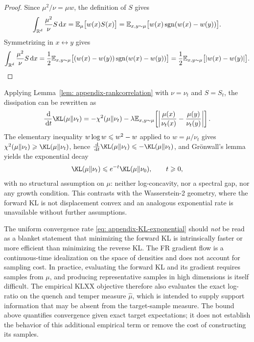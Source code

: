 \documentclass{article}
\begin{document}
\begin{proof}
Since $\mu^2/\nu = \mu w$, the definition of $S$ gives
\begin{equation*}
    \int_{\mathbb R^d}\frac{\mu^2}{\nu}S\,\mathrm d x = \mathbb E_\mu\bigl[w(x)S(x)\bigr] = \mathbb E_{x,y\sim\mu}\bigl[w(x)\operatorname{sgn}(w(x) - w(y))\bigr].
\end{equation*}
Symmetrizing in $x\leftrightarrow y$ gives
\begin{equation*}
    \int_{\mathbb R^d}\frac{\mu^2}{\nu}S\,\mathrm d x = \frac{1}{2} \mathbb E_{x,y\sim\mu}\bigl[(w(x) - w(y))\operatorname{sgn}(w(x) - w(y))\bigr] = \frac{1}{2} \mathbb E_{x,y\sim\mu}\bigl[ |w(x) - w(y)| \bigr].
\end{equation*}
\end{proof}

Applying Lemma~\ref{lem: appendix-rankcorrelation} with $\nu = \nu_t$ and $S = S_t$, the dissipation can be rewritten as
\begin{equation}
    \frac{\D}{\D t}\KL(\mu\|\nu_t) = -\chi^2(\mu\|\nu_t) - \lambda \mathbb E_{x,y\sim\mu}\!\left[ \left|\frac{\mu(x)}{\nu_t(x)} - \frac{\mu(y)}{\nu_t(y)}\right| \right].
    \label{eq: appendix-combined-rate}
\end{equation}
The elementary inequality $w\log w \leqslant w^2 - w$ applied to $w = \mu/\nu_t$ gives $\chi^2(\mu\|\nu_t) \Ge \KL(\mu\|\nu_t)$, hence $\frac{\D}{\D t}\KL(\mu\|\nu_t) \Le -\KL(\mu\|\nu_t)$, and Gr\"onwall's lemma yields the exponential decay
\begin{equation}
    \KL(\mu\|\nu_t) \Le e^{-t} \KL(\mu\|\nu_0),\qquad t \Ge 0,
    \label{eq: appendix-KL-exponential}
\end{equation}
with no structural assumption on $\mu$: neither log-concavity, nor a spectral gap, nor any growth condition. This contrasts with the Wasserstein-2 geometry, where the forward KL is not displacement convex and an analogous exponential rate is unavailable without further assumptions.

The uniform convergence rate \eqref{eq: appendix-KL-exponential} should \emph{not} be read as a blanket statement that minimizing the forward KL is intrinsically faster or more efficient than minimizing the reverse KL. The FR gradient flow is a continuous-time idealization on the space of densities and does not account for sampling cost. In practice, evaluating the forward KL and its gradient requires samples from $\mu$, and producing representative samples in high dimensions is itself difficult. The empirical KLXX objective therefore also evaluates the exact log-ratio on the quench and temper measure $\hat\mu$, which is intended to supply support information that may be absent from the target-sample measure. The bound above quantifies convergence given exact target expectations; it does not establish the behavior of this additional empirical term or remove the cost of constructing its samples.
\end{document}
